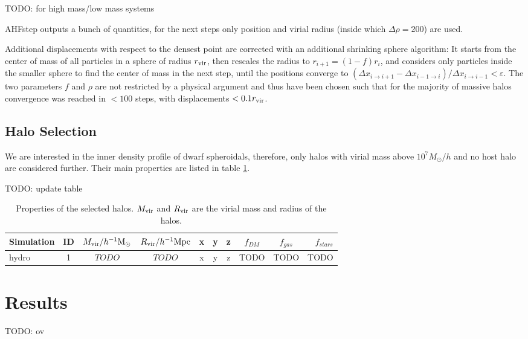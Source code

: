 \documentclass[useAMS,usenatbib]{mn2e}
\begin{document}
TODO: for high mass/low mass systems

{\sc AHFstep} outputs a bunch of quantities, for the next steps only
position and virial radius (inside which $\Delta\rho=200$) are used.

Additional displacements with respect to the densest point are
corrected with an additional shrinking sphere algorithm: It starts
from the center of mass of all particles in a sphere of radius $r_{\rm
  vir}$, then rescales the radius to $r_{i+1}=(1-f)r_i$, and considers
only particles inside the smaller sphere to find the center of mass in
the next step, until the positions converge to $(\Delta x_{i\to
  i+1}-\Delta x_{i-1\to i})/\Delta x_{i\to i-1}<\varepsilon$. The two
parameters $f$ and $\rho$ are not restricted by a physical argument
and thus have been chosen such that for the majority of massive halos
convergence was reached in $<100$ steps, with displacements
$<0.1r_{\rm vir}$.

\subsection{Halo Selection}
We are interested in the inner density profile of dwarf spheroidals,
therefore, only halos with virial mass above $10^7M_\odot/h$ and no
host halo are considered further. Their main properties are listed in
table \ref{tab:haloprop}.

TODO: update table
\begin{table}
  \begin{center} \begin{tabular}{lccccccccr} \hline Simulation &
      ID & $M_{\rm vir} / h^{-1}{\rm M}_\odot $ & $R_{\rm vir} /
      h^{-1}{\rm Mpc}$ &x&y&z& $f_{DM}$ & $f_{gas}$ & $f_{stars}$ \\ 
      \hline
      hydro & 1 & $TODO$ & $TODO$ & x & y & z & TODO & TODO & TODO\\

      \hline
    \end{tabular} \end{center}
  \caption{\label{tab:haloprop}Properties of the selected halos. $M_{\rm vir}$ and $R_{\rm vir}$ are the virial mass and radius of the halos.}
\end{table}


\section{Results}
\label{sec:res}
TODO: ov
\end{document}

